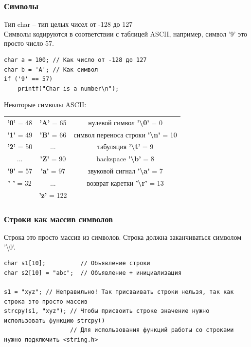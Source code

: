 \documentclass{article}
\begin{document}
\subsubsection*{Символы}
\begin{multicols}{2}
Тип char -- тип целых чисел от -128 до 127\\
Символы кодируются в соответствии с таблицей ASCII,
например, символ '9' это просто число 57.
\begin{lstlisting}
char a = 100; // Как число от -128 до 127
char b = 'A'; // Как символ
if ('9' == 57)
    printf("Char is a number\n");
\end{lstlisting}
Некоторые символы ASCII:\\
\begin{tabular}{ c | c | c }
  {\color{red}\textbf{'0'}} = 48 & {\color{red}\textbf{'A'}} = 65 & нулевой символ  {\color{red}\textbf{'\textbackslash 0'}} = 0 \\
  {\color{red}\textbf{'1'}} = 49 & {\color{red}\textbf{'B'}} = 66 & символ переноса строки {\color{red}\textbf{'\textbackslash n'}} = 10 \\
  {\color{red}\textbf{'2'}} = 50 & ...                             & табуляция {\color{red}\textbf{'\textbackslash t'}} = 9 \\
  ...                            & {\color{red}\textbf{'Z'}} = 90 & backspace {\color{red}\textbf{'\textbackslash b'}} = 8 \\
  {\color{red}\textbf{'9'}} = 57 & {\color{red}\textbf{'a'}} = 97 & звуковой сигнал {\color{red}\textbf{'\textbackslash a'}} = 7 \\
  {\color{red}\textbf{' '}} = 32 & ...                           & возврат каретки {\color{red}\textbf{'\textbackslash r'}} = 13 \\
                                 & {\color{red}\textbf{'z'}} = 122  &   \\
\end{tabular}
\end{multicols}

\subsubsection*{Строки как массив символов}
Строка это просто массив из символов. Строка должна заканчиваться символом '\textbackslash 0'.
\begin{lstlisting}
char s1[10];          // Объявление строки
char s2[10] = "abc";  // Объявление + инициализация

s1 = "xyz"; // Неправильно! Так присваивать строки нельзя, так как строка это просто массив
strcpy(s1, "xyz"); // Чтобы присвоить строке значение нужно использовать функцию strcpy()
                   // Для использования функций работы со строками нужно подключить <string.h>
\end{lstlisting}
\end{document}
